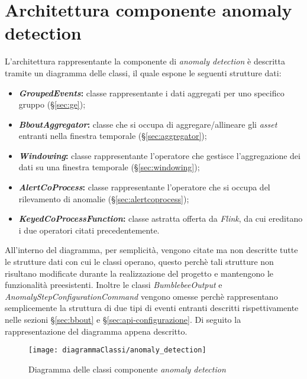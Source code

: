 

\section{Architettura componente anomaly detection}
L'architettura rappresentante la componente di \textit{anomaly detection} è descritta tramite un \gls{diagramma delle classi}, il quale espone le seguenti strutture dati:
\begin{itemize}
	\item{\textbf{\textit{GroupedEvents}:} classe rappresentante i dati aggregati per uno specifico gruppo (\S\ref{sec:ge});}
	\item{\textbf{\textit{BboutAggregator}:} classe che si occupa di aggregare/allineare gli \textit{asset} entranti nella finestra temporale (\S\ref{sec:aggregator});}
	\item{\textbf{\textit{Windowing}:} classe rappresentante l'operatore che gestisce l'aggregazione dei dati su una finestra temporale (\S\ref{sec:windowing});}
	\item{\textbf{\textit{AlertCoProcess}:} classe rappresentante l'operatore che si occupa del rilevamento di anomalie (\S\ref{sec:alertcoprocess});}
	\item{\textbf{\textit{KeyedCoProcessFunction}:} classe astratta offerta da \textit{Flink}, da cui ereditano i due operatori citati precedentemente.}
\end{itemize}
All'interno del diagramma, per semplicità, vengono citate ma non descritte tutte le strutture dati con cui le classi operano, questo perchè tali strutture non risultano modificate durante la realizzazione del progetto e mantengono le funzionalità preesistenti. Inoltre le classi \textit{BumblebeeOutput} e \textit{AnomalyStepConfigurationCommand} vengono omesse perchè rappresentano semplicemente la struttura di due tipi di eventi entranti descritti rispettivamente nelle sezioni \S\ref{sec:bbout} e \S\ref{sec:api-configurazione}.
Di seguito la rappresentazione del diagramma appena descritto.

\begin{figure}[H] 
    \centering 
    \texttt{[image: diagrammaClassi/anomaly\_detection]} 
    \caption{Diagramma delle classi componente \textit{anomaly detection}}
\end{figure}

